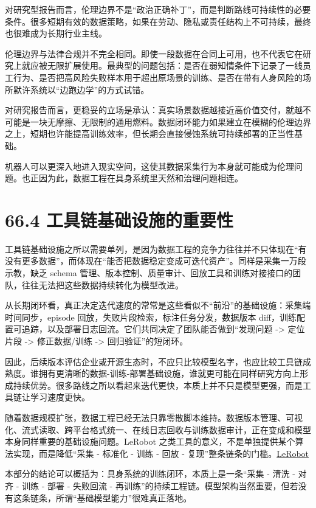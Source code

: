 对研究型报告而言，伦理边界不是“政治正确补丁”，而是判断路线可持续性的必要条件。很多短期有效的数据策略，如果在劳动、隐私或责任结构上不可持续，最终也很难成为长期行业主线。

伦理边界与法律合规并不完全相同。即使一段数据在合同上可用，也不代表它在研究上就应被无限扩展使用。最典型的问题包括：是否在弱知情条件下记录了一线员工行为、是否把高风险失败样本用于超出原场景的训练、是否在带有人身风险的场所默许系统以“边跑边学”的方式试错。

对研究报告而言，更稳妥的立场是承认：真实场景数据越接近高价值交付，就越不可能是一块无摩擦、无限制的通用燃料。数据闭环能力如果建立在模糊的伦理边界之上，短期也许能提高训练效率，但长期会直接侵蚀系统可持续部署的正当性基础。

机器人可以更深入地进入现实空间，这使其数据采集行为本身就可能成为伦理问题。也正因为此，数据工程在具身系统里天然和治理问题相连。

\section*{66.4 工具链基础设施的重要性}


工具链基础设施之所以需要单列，是因为数据工程的竞争力往往并不只体现在“有没有更多数据”，而体现在“能否把数据稳定变成可迭代资产”。同样是采集一万段示教，缺乏 schema 管理、版本控制、质量审计、回放工具和训练对接接口的团队，往往无法把这些数据持续转化为模型改进。

从长期闭环看，真正决定迭代速度的常常是这些看似不“前沿”的基础设施：采集端时间同步，episode 回放，失败片段检索，标注任务分发，数据版本 diff，训练配置可追踪，以及部署日志回流。它们共同决定了团队能否做到“发现问题 -> 定位片段 -> 修正数据/训练 -> 回归验证”的短闭环。

因此，后续版本评估企业或开源生态时，不应只比较模型名字，也应比较工具链成熟度。谁拥有更清晰的数据-训练-部署基础设施，谁就更可能在同样研究方向上形成持续优势。很多路线之所以看起来迭代更快，本质上并不只是模型更强，而是工具链让学习速度更快。

随着数据规模扩张，数据工程已经无法只靠零散脚本维持。数据版本管理、可视化、流式读取、跨平台格式统一、在线日志回收与训练数据审计，正在变成和模型本身同样重要的基础设施问题。LeRobot 之类工具的意义，不是单独提供某个算法实现，而是降低“采集 - 标准化 - 训练 - 回放 - 复现”整条链条的门槛。\href{https://arxiv.org/abs/2602.22818}{LeRobot}

本部分的结论可以概括为：具身系统的训练闭环，本质上是一条“采集 - 清洗 - 对齐 - 训练 - 部署 - 失败回流 - 再训练”的持续工程链。模型架构当然重要，但若没有这条链条，所谓“基础模型能力”很难真正落地。

